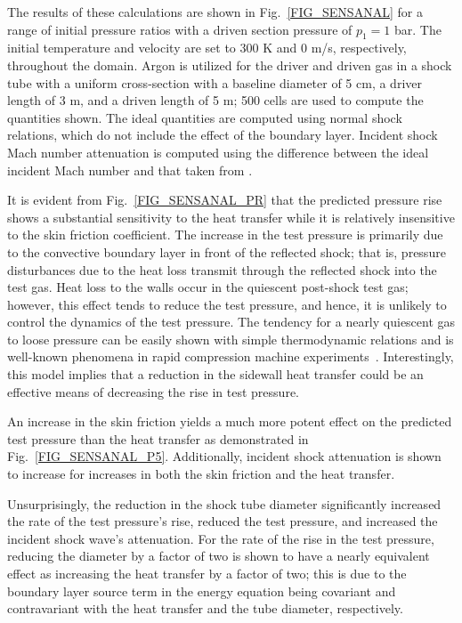 The results of these calculations are shown in Fig.~\ref{FIG_SENSANAL} for a range of initial pressure ratios with a driven section pressure of $p_1=1$ bar. The initial temperature and velocity are set to 300 K and 0 m/s, respectively, throughout the domain. Argon is utilized for the driver and driven gas in a shock tube with a uniform cross-section with a baseline diameter of 5 cm, a driver length of 3 m, and a driven length of 5 m; 500 cells are used to compute the quantities shown. The ideal quantities are computed using normal shock relations, which do not include the effect of the boundary layer. Incident shock Mach number attenuation is computed using the difference between the ideal incident Mach number and that taken from \stnshk.

It is evident from Fig.~\ref{FIG_SENSANAL_PR} that the predicted pressure rise shows a substantial sensitivity to the heat transfer while it is relatively insensitive to the skin friction coefficient. The increase in the test pressure is primarily due to the convective boundary layer in front of the reflected shock; that is, pressure disturbances due to the heat loss transmit through the reflected shock into the test gas. Heat loss to the walls occur in the quiescent post-shock test gas; however, this effect tends to reduce the test pressure, and hence, it is unlikely to control the dynamics of the test pressure. The tendency for a nearly quiescent gas to loose pressure can be easily shown with simple thermodynamic relations and is well-known phenomena in rapid compression machine experiments~\cite{SUNG_CURRAN_PECS2014}. Interestingly, this model implies that a reduction in the sidewall heat transfer could be an effective means of decreasing the rise in test pressure.


An increase in the skin friction yields a much more potent effect on the predicted test pressure than the heat transfer as demonstrated in Fig.~\ref{FIG_SENSANAL_P5}. Additionally, incident shock attenuation is shown to increase for increases in both the skin friction and the heat transfer.

 Unsurprisingly, the reduction in the shock tube diameter significantly increased the rate of the test pressure's rise, reduced the test pressure, and increased the incident shock wave's attenuation. For the rate of the rise in the test pressure, reducing the diameter by a factor of two is shown to have a nearly equivalent effect as increasing the heat transfer by a factor of two; this is due to the boundary layer source term in the energy equation being covariant and contravariant with the heat transfer and the tube diameter, respectively. 


